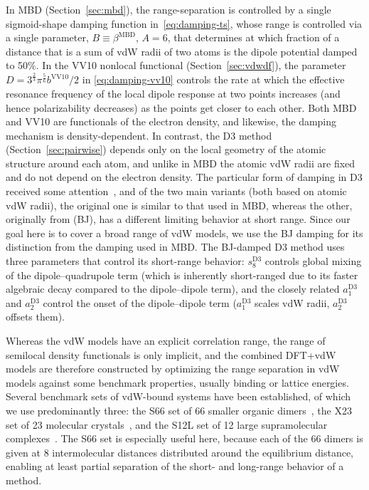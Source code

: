 In MBD (Section~\ref{sec:mbd}), the range-separation is controlled by a single sigmoid-shape damping function in~\eqref{eq:damping-ts}, whose range is controlled via a single parameter, $B\equiv\beta^\text{MBD}$, $A=6$, that determines at which fraction of a distance that is a sum of vdW radii of two atoms is the dipole potential damped to 50\%.
In the VV10 nonlocal functional (Section~\ref{sec:vdwdf}), the parameter $D=3^\frac23\pi^\frac56b^\text{VV10}/2$ in \eqref{eq:damping-vv10} controls the rate at which the effective resonance frequency of the local dipole response at two points increases (and hence polarizability decreases) as the points get closer to each other.
Both MBD and VV10 are functionals of the electron density, and likewise, the damping mechanism is density-dependent.
In contrast, the D3 method (Section~\ref{sec:pairwise}) depends only on the local geometry of the atomic structure around each atom, and unlike in MBD the atomic vdW radii are fixed and do not depend on the electron density.
The particular form of damping in D3 received some attention~\cite{GrimmeJCC11,SchroderJCTC15,SmithJPCL16,WitteJCTC17}, and of the two main variants (both based on atomic vdW radii), the original one is similar to that used in MBD, whereas the other, originally from \citet{JohnsonJCP06} (BJ), has a different limiting behavior at short range.
Since our goal here is to cover a broad range of vdW models, we use the BJ damping for its distinction from the damping used in MBD\@.
The BJ-damped D3 method uses three parameters that control its short-range behavior: $s_8^\text{D3}$ controls global mixing of the dipole--quadrupole term (which is inherently short-ranged due to its faster algebraic decay compared to the dipole--dipole term), and the closely related $a_1^\text{D3}$ and $a_2^\text{D3}$ control the onset of the dipole--dipole term ($a_1^\text{D3}$ scales vdW radii, $a_2^\text{D3}$ offsets them).

Whereas the vdW models have an explicit correlation range, the range of semilocal density functionals is only implicit, and the combined DFT+vdW models are therefore constructed by optimizing the range separation in vdW models against some benchmark properties, usually binding or lattice energies.
Several benchmark sets of vdW-bound systems have been established, of which we use predominantly three: the S66 set of 66 smaller organic dimers~\cite{RezacJCTC11}, the X23 set of 23 molecular crystals~\cite{Otero-de-la-RozaJCP12,ReillyJCP13}, and the S12L set of 12 large supramolecular complexes~\cite{GrimmeCEJ12}.
The S66 set is especially useful here, because each of the 66 dimers is given at 8 intermolecular distances distributed around the equilibrium distance, enabling at least partial separation of the short- and long-range behavior of a method.

